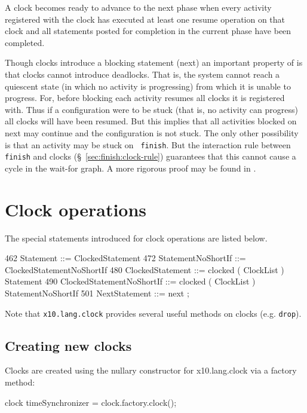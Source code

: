 A clock becomes ready to advance to the next phase when every activity
registered with the clock has executed at least one {\cf resume}
operation on that clock and all statements posted for completion in
the current phase have been completed.

Though clocks introduce a blocking statement ({\cf next}) an important
property of \Xten{} is that clocks cannot introduce deadlocks. That
is, the system cannot reach a quiescent state (in which no activity is
progressing) from which it is unable to progress. For, before blocking
each activity resumes all clocks it is registered with. Thus if a
configuration were to be stuck (that is, no activity can progress) all
clocks will have been resumed. But this implies that all activities
blocked on {\cf next} may continue and the configuration is not stuck.
The only other possibility is that an activity may be stuck on {\tt
finish}. But the interaction rule between {\tt finish} and clocks
(\S~\ref{sec:finish:clock-rule}) guarantees that this cannot cause a cycle
in the wait-for graph. A more rigorous proof may be found in \cite{X10-concur05}.

\section{Clock operations}\label{sec:clock}
The special statements introduced for clock operations are listed below.
\begin{x10}
462 Statement ::= ClockedStatement
472 StatementNoShortIf ::= 
      ClockedStatementNoShortIf
480 ClockedStatement ::= 
      clocked ( ClockList ) Statement
490 ClockedStatementNoShortIf ::= 
      clocked ( ClockList ) 
         StatementNoShortIf
501 NextStatement ::= next ;
\end{x10}

Note that {\tt x10.lang.clock} provides several useful methods on
clocks (e.g. {\tt drop}).

\subsection{Creating new clocks}\label{sec:clock:create}
Clocks are created using the nullary constructor for {\cf
x10.lang.clock} via a factory method:

\begin{x10}
clock timeSynchronizer = clock.factory.clock();
\end{x10}

